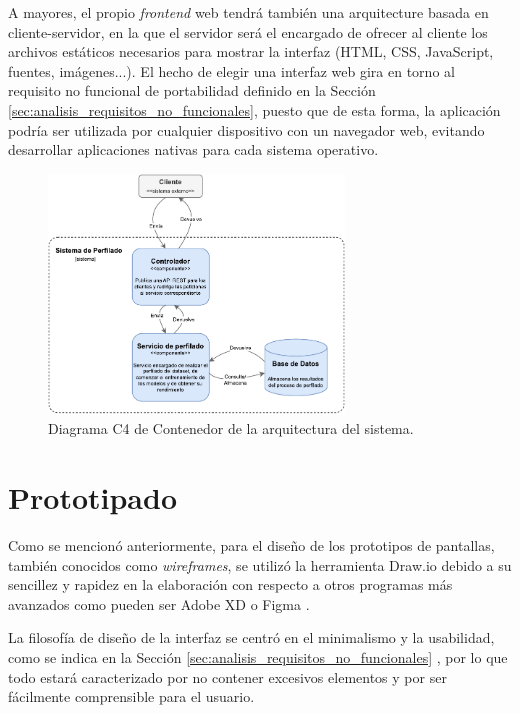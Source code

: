\bigskip
A mayores, el propio \textit{frontend} web tendrá también una arquitecture basada en cliente-servidor, en la que el servidor será el encargado
de ofrecer al cliente los archivos estáticos necesarios para mostrar la interfaz (HTML, CSS, JavaScript, fuentes, imágenes...). El hecho
de elegir una interfaz web gira en torno al requisito no funcional de portabilidad definido en la Sección \ref{sec:analisis_requisitos_no_funcionales},
puesto que de esta forma, la aplicación podría ser utilizada por cualquier dispositivo con un navegador web, evitando
desarrollar aplicaciones nativas para cada sistema operativo.

\bigskip
\begin{figure}[H]
	\centering
	\includegraphics[width=0.7\textwidth]{diagramas/arquitectura_contenedor.pdf}
	\caption{Diagrama C4 de Contenedor de la arquitectura del sistema.}
	\label{fig:arquitectura_contenedor}
\end{figure}

\section{Prototipado}
\label{sec:diseño_prototipado}

Como se mencionó anteriormente, para el diseño de los prototipos de pantallas, también conocidos como \textit{wireframes}, se utilizó
la herramienta Draw.io \cite{drawio} debido a su sencillez y rapidez en la elaboración con respecto a otros programas más avanzados
como pueden ser Adobe XD \cite{adobexd} o Figma \cite{figma}.

\bigskip
La filosofía de diseño de la interfaz se centró en el minimalismo y la usabilidad, como se indica en la Sección \ref{sec:analisis_requisitos_no_funcionales}
, por lo que todo estará caracterizado por no contener excesivos elementos y por ser fácilmente comprensible para el usuario. 

